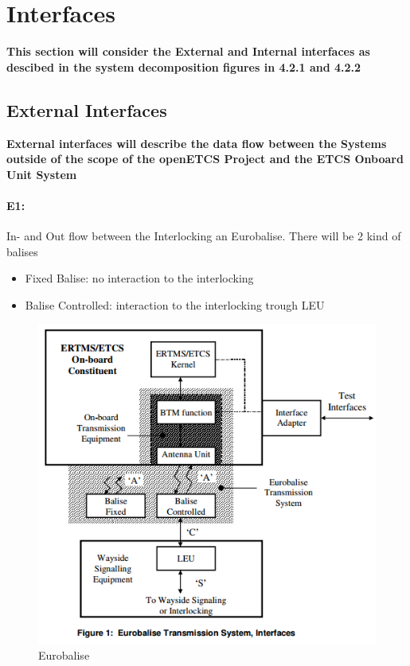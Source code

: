 \newpage
\section{Interfaces}
\textbf{This section will consider the External and Internal interfaces as descibed in the system decomposition figures in 4.2.1 and 4.2.2}

\subsection{External Interfaces}
\textbf{External interfaces will describe the data flow between the Systems outside of the scope of the openETCS Project and the ETCS Onboard Unit System}

\paragraph*{E1:} In- and Out flow between the Interlocking an Eurobalise. There will be 2 kind of balises

\begin{itemize}
\item Fixed Balise: no interaction to the interlocking
\item Balise Controlled: interaction to the interlocking trough LEU
\end{itemize}

\begin{figure}[h]
\centering
\includegraphics[scale=0.8]{images/Eurobalise}
\caption{Eurobalise}
\label{Eurobalise}
\end{figure}



